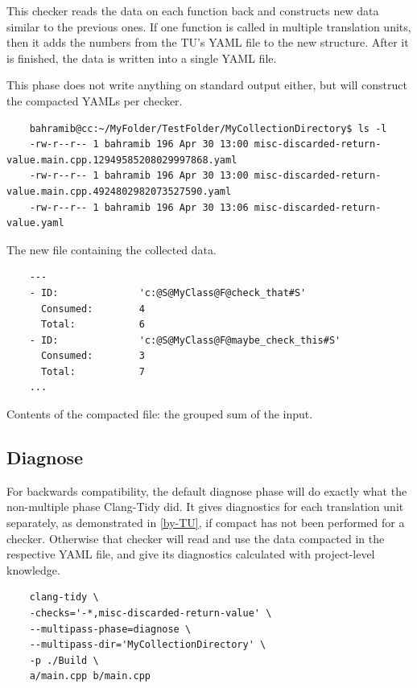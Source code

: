 This checker reads the data on each function back and constructs new data similar to the previous ones. If one function is called in multiple
translation units, then it adds the numbers from the TU's YAML file to the new structure. After it is finished, the data is
written into a single YAML file.

This phase does not write anything on standard output either, but will construct the compacted YAMLs per checker.

\begin{listing}[H]
	\begin{verbatim}
	bahramib@cc:~/MyFolder/TestFolder/MyCollectionDirectory$ ls -l
	-rw-r--r-- 1 bahramib 196 Apr 30 13:00 misc-discarded-return-value.main.cpp.12949585208029997868.yaml
	-rw-r--r-- 1 bahramib 196 Apr 30 13:00 misc-discarded-return-value.main.cpp.4924802982073527590.yaml
	-rw-r--r-- 1 bahramib 196 Apr 30 13:06 misc-discarded-return-value.yaml
	\end{verbatim}
	\caption{The new file containing the collected data.}
\end{listing}

\begin{listing}[H]
	\begin{verbatim}
	---
	- ID:              'c:@S@MyClass@F@check_that#S'
	  Consumed:        4
	  Total:           6
	- ID:              'c:@S@MyClass@F@maybe_check_this#S'
	  Consumed:        3
	  Total:           7
	...
	\end{verbatim}
	\caption{Contents of the compacted file: the grouped sum of the input.}
\end{listing}

\subsection{Diagnose}

For backwards compatibility, the default diagnose phase will do exactly what the non-multiple
phase Clang-Tidy did. It gives diagnostics for each translation unit separately, as demonstrated in \cref{by-TU},
if compact has not been performed for a checker. Otherwise that checker will read and use the data compacted
in the respective YAML file, and give its diagnostics calculated with project-level knowledge.

\begin{listing}[H]
	\begin{verbatim}
	clang-tidy \
	-checks='-*,misc-discarded-return-value' \
	--multipass-phase=diagnose \
	--multipass-dir='MyCollectionDirectory' \
	-p ./Build \
	a/main.cpp b/main.cpp
	\end{verbatim}
\end{listing}

